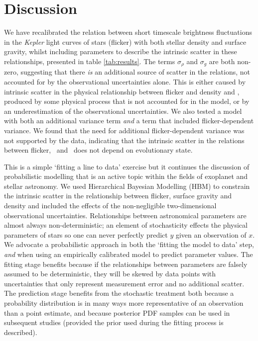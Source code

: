 \section{Discussion}
\label{sec:discussion}

We have recalibrated the relation between short timescale brightness
fluctuations in the {\it Kepler} light curves of stars (flicker) with both
stellar density and surface gravity, whilst including parameters to describe
the intrinsic scatter in these relationships, presented in table
\ref{tab:results}.
The terms $\sigma_\rho$ and $ \sigma_g$ are both non-zero, suggesting that
there {\it is} an additional source of scatter in the relations, not accounted
for by the observational uncertainties alone.
This is either caused by intrinsic scatter in the physical relationship
between flicker and density and \logg, produced by some physical process that
is not accounted for in the model, or by an underestimation of the
observational uncertainties.
We also tested a model with both an additional variance term {\it and} a term
that included flicker-dependent variance.
We found that the need for additional flicker-dependent variance was not
supported by the data, indicating that the intrinsic scatter in the relations
between flicker, \logg\ and \rhostar\ does not depend on evolutionary state.

This is a simple `fitting a line to data' exercise but it continues the
discussion of probabilistic modelling that is an active topic within the
fields of exoplanet and stellar astronomy.
We used Hierarchical Bayesian Modelling (HBM) to constrain the intrinsic
scatter in the relationship between flicker, surface gravity and density and
included the effects of the non-negligible two-dimensional observational
uncertainties.
Relationships between astronomical parameters are almost always
non-deterministic; an element of stochasticity effects the physical parameters
of stars so one can never perfectly predict $y$ given an observation of $x$.
We advocate a probabilistic approach in both the `fitting the model to data'
step, {\it and} when using an empirically calibrated model to predict
parameter values.
The fitting stage benefits because if the relationships between parameters are
falsely assumed to be deterministic, they will be skewed by data points with
uncertainties that only represent measurement error and no additional scatter.
The prediction stage benefits from the stochastic treatment both because a
probability distribution is in many ways more representative of an observation
than a point estimate, and because posterior PDF samples can be used in
subsequent studies (provided the prior used during the fitting process is
described).

